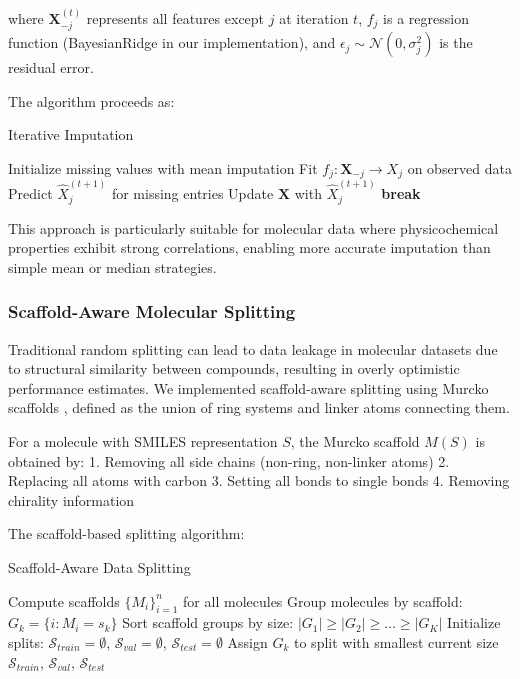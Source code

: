 \documentclass[preprint, 10pt]{elsarticle}
\begin{document}
where $\mathbf{X}_{-j}^{(t)}$ represents all features except $j$ at iteration $t$, $f_j$ is a regression function (BayesianRidge in our implementation), and $\epsilon_j \sim \mathcal{N}(0, \sigma_j^2)$ is the residual error.

The algorithm proceeds as:
\begin{algorithm}
\caption{Iterative Imputation}
\begin{algorithmic}
\STATE Initialize missing values with mean imputation
        \STATE Fit $f_j: \mathbf{X}_{-j} \rightarrow X_j$ on observed data
        \STATE Predict $\hat{X}_j^{(t+1)}$ for missing entries
        \STATE Update $\mathbf{X}$ with $\hat{X}_j^{(t+1)}$
    \ENDFOR
        \STATE \textbf{break}
    \ENDIF
\ENDFOR
\end{algorithmic}
\end{algorithm}

This approach is particularly suitable for molecular data where physicochemical properties exhibit strong correlations, enabling more accurate imputation than simple mean or median strategies.

\subsubsection{Scaffold-Aware Molecular Splitting}
Traditional random splitting can lead to data leakage in molecular datasets due to structural similarity between compounds, resulting in overly optimistic performance estimates. We implemented scaffold-aware splitting using Murcko scaffolds \cite{bemis1996properties}, defined as the union of ring systems and linker atoms connecting them.

For a molecule with SMILES representation $S$, the Murcko scaffold $M(S)$ is obtained by:
1. Removing all side chains (non-ring, non-linker atoms)
2. Replacing all atoms with carbon
3. Setting all bonds to single bonds
4. Removing chirality information

The scaffold-based splitting algorithm:
\begin{algorithm}
\caption{Scaffold-Aware Data Splitting}
\begin{algorithmic}
\STATE Compute scaffolds $\{M_i\}_{i=1}^n$ for all molecules
\STATE Group molecules by scaffold: $G_k = \{i : M_i = s_k\}$
\STATE Sort scaffold groups by size: $|G_1| \geq |G_2| \geq \ldots \geq |G_K|$
\STATE Initialize splits: $\mathcal{S}_{train} = \emptyset$, $\mathcal{S}_{val} = \emptyset$, $\mathcal{S}_{test} = \emptyset$
    \STATE Assign $G_k$ to split with smallest current size
\ENDFOR
\RETURN $\mathcal{S}_{train}$, $\mathcal{S}_{val}$, $\mathcal{S}_{test}$
\end{algorithmic}
\end{algorithm}
\end{document}
